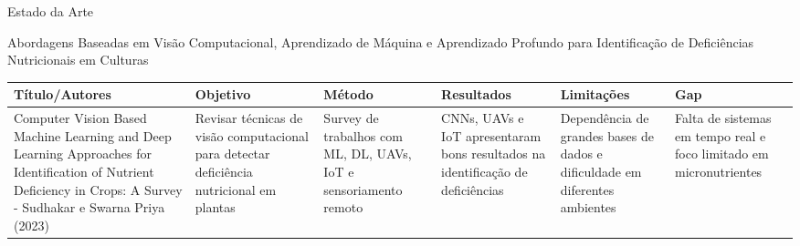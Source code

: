 \documentclass[aspectratio=169]{beamer}
\begin{document}
\begin{frame}[t]{Estado da Arte}
  \scriptsize

  Abordagens Baseadas em Visão Computacional, Aprendizado de
  Máquina e Aprendizado Profundo para Identificação de Deficiências
  Nutricionais em Culturas
  
  \vspace{0.3cm}
  
  \begin{table}
    \centering
    \tiny
    \begin{tabular}{|p{2.5cm}|p{2cm}|p{2cm}|p{2cm}|p{2cm}|p{1.5cm}|}
      \hline
      \textbf{Título/Autores} & \textbf{Objetivo} & \textbf{Método} & \textbf{Resultados} & \textbf{Limitações} & \textbf{Gap} \\
      \hline
      Computer Vision Based Machine Learning and Deep Learning Approaches for Identification of Nutrient Deficiency in Crops: A Survey - Sudhakar e Swarna Priya (2023)
      & Revisar técnicas de visão computacional para detectar deficiência nutricional em plantas
      & Survey de trabalhos com ML, DL, UAVs, IoT e sensoriamento remoto
      & CNNs, UAVs e IoT apresentaram bons resultados na identificação de deficiências
      & Dependência de grandes bases de dados e dificuldade em diferentes ambientes
      & Falta de sistemas em tempo real e foco limitado em micronutrientes
      \\
      \hline

    \end{tabular}
  \end{table}
\end{frame}
\end{document}
